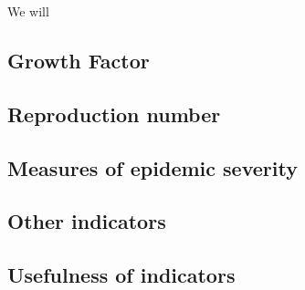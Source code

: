 We will 

\subsection{Growth Factor}
\label{subsec:growth_factor}

\subsection{Reproduction number}
\label{subsec:reproduction_number}

\subsection{Measures of epidemic severity}
\label{subsec:measures-severity}

\subsection{Other indicators}
\label{subsec:other_indicat}

\subsection{Usefulness of indicators}
\label{subsec:usefulness_of_indicators}

